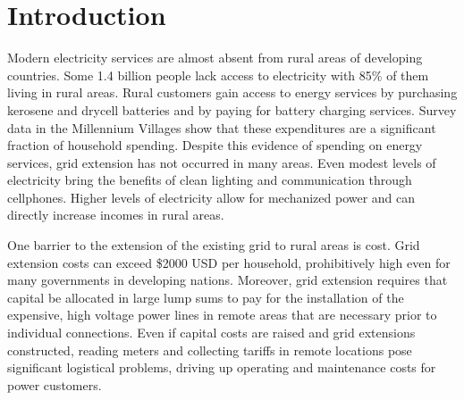 \documentclass{sig-alternate}
\begin{document}
\section{Introduction}
Modern electricity services are almost absent from rural
areas of developing countries.
Some 1.4 billion people lack access to electricity with 85\% of
them living in rural areas.\cite{WEO2010}
Rural customers gain access to energy services by purchasing
kerosene and drycell batteries and by paying for battery charging
services.
Survey data in the Millennium Villages show that these expenditures
are a significant fraction of household spending.\cite{MVPEnergy}
Despite this evidence of spending on energy services,
grid extension has not occurred in many areas.
Even modest levels of electricity bring the benefits of clean lighting
and communication through cellphones.\cite{Cabraal:2005}
Higher levels of electricity allow for mechanized power and can
directly increase incomes in rural areas.\cite{Kirubi:2009}

One barrier to the extension of the existing grid to rural areas is cost.
Grid extension costs can exceed \$2000 USD per household, prohibitively
high even for many governments in developing
nations.\cite{ModiPlanningKenya}
Moreover, grid extension requires that capital be allocated in large
lump sums to pay for the installation of the expensive, high voltage power
lines in remote areas that are necessary prior to individual connections.
Even if capital costs are raised and grid extensions constructed,
reading meters and collecting tariffs in remote locations pose
significant logistical problems, driving up operating and maintenance
costs for power customers.
\end{document}

